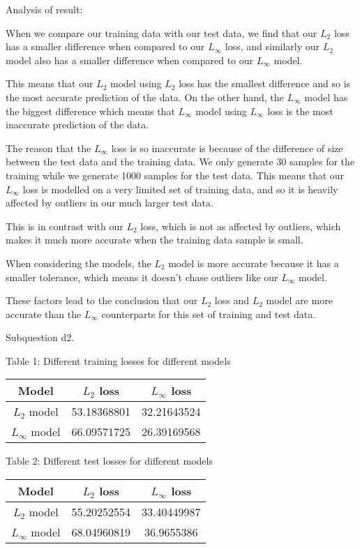 \documentclass[12pt]{article}
\newcounter{ques}
\newenvironment{question}{\stepcounter{ques}{\noindent\bf Question \arabic{ques}:}}{\vspace{5mm}}
\begin{document}
\begin{question}
Analysis of result:

When we compare our training data with our test data, we find that our $L_2$ loss has a smaller difference when compared to our $L_{\infty}$ loss, and similarly our $L_2$ model also has a smaller difference when compared to our $L_{\infty}$ model.

This means that our $L_2$ model using $L_2$ loss has the smallest difference and so is the most accurate prediction of the data. On the other hand, the $L_{\infty}$ model has the biggest difference which means that $L_{\infty}$ model using $L_{\infty}$ loss is the most inaccurate prediction of the data.

The reason that the $L_{\infty}$ loss is so inaccurate is because of the difference of size between the test data and the training data. We only generate 30 samples for the training while we generate 1000 samples for the test data. This means that our $L_{\infty}$ loss is modelled on a very limited set of training data, and so it is heavily affected by outliers in our much larger test data.

This is in contrast with our $L_2$ loss, which is not as affected by outliers, which makes it much more accurate when the training data sample is small.

When considering the models, the $L_2$ model is more accurate because it has a smaller tolerance, which means it doesn't chase outliers like our $L_{\infty}$ model.

These factors lead to the conclusion that our $L_2$ loss and $L_2$ model are more accurate than the $L_{\infty}$ counterparts for this set of training and test data.

\quad

Subquestion d2.

\begin{center}
Table 1: Different training losses for different models
\end{center}
\begin{table}[h]
\centering
\begin{tabular}{c|cc}
    \textbf{Model} & $L_2$ loss & $L_\infty$ loss \\
    \hline
    $L_2$ model   &      53.18368801      &         32.21643524        \\
    $L_\infty$ model &      66.09571725      &           26.39169568      
\end{tabular}
\end{table}

\begin{center}
Table 2: Different test losses for different models
\end{center}
\begin{table}[h]
\centering
\begin{tabular}{c|cc}
    \textbf{Model} & $L_2$ loss & $L_\infty$ loss \\
    \hline
    $L_2$ model   &      55.20252554      &        33.40449987         \\
    $L_\infty$ model &      68.04960819      &         36.9655386        
\end{tabular}
\end{table}


\end{question}
\end{document}

